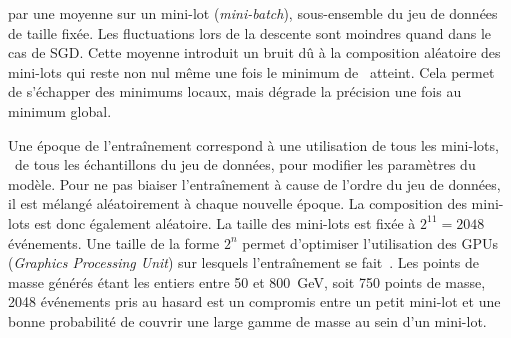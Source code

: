 par une moyenne
sur un \og mini-lot \fg{} (\emph{mini-batch}), sous-ensemble du jeu de données de taille fixée.
Les fluctuations lors de la descente sont moindres quand dans le cas de SGD.
Cette moyenne introduit un bruit dû à la composition aléatoire des mini-lots
qui reste non nul même une fois le minimum de \Loss\ atteint.
Cela permet de s'échapper des minimums locaux, mais dégrade la précision une fois au minimum global.
\par
Une \og époque \fg{} de l'entraînement correspond à une utilisation de tous les mini-lots, \ie\ de tous les échantillons du jeu de données, pour modifier les paramètres du modèle.
Pour ne pas biaiser l'entraînement à cause de l'ordre du jeu de données,
il est mélangé aléatoirement à chaque nouvelle époque.
La composition des mini-lots est donc également aléatoire.
La taille des mini-lots est fixée à $2^{11}=\num{2048}$ événements.
Une taille de la forme $2^n$ permet d'optimiser l'utilisation des GPUs (\emph{Graphics Processing Unit}) sur lesquels l'entraînement se fait~\cite{DNN}.
Les points de masse générés étant les entiers entre \num{50} et \SI{800}{\GeV}, soit \num{750} points de masse,
\num{2048} événements pris au hasard est un compromis entre
un petit mini-lot
et
une bonne probabilité de couvrir une large gamme de masse au sein d'un mini-lot.
